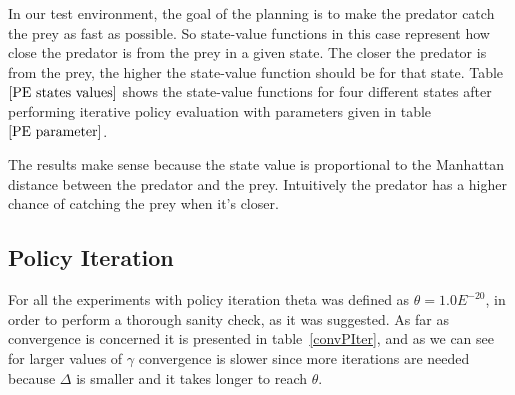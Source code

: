 \documentclass[paper=a4, fontsize=11pt]{scrartcl}
\numberwithin{equation}{section}		%
\numberwithin{figure}{section}			%
\numberwithin{table}{section}				%
\begin{document}
In our test environment, the goal of the planning is to make the predator catch the prey as fast as possible. So state-value functions in this case represent how close the predator is from the prey in a given state. The closer the predator is from the prey, the higher the state-value function should be for that state. Table $\ref{PE states values}$ shows the state-value functions for four different states after performing iterative policy evaluation with parameters given in table $\ref{PE parameter}$.

The results make sense because the state value is proportional to the Manhattan distance between the predator and the prey. Intuitively the predator has a higher chance of catching the prey when it's closer.



\subsection{Policy Iteration}
For all the experiments with policy iteration theta was defined as $\theta = 1.0E^{-20}$, in order to perform a thorough sanity check, as it was suggested. As far as convergence is concerned it is presented in table~\ref{convPIter}, and as we can see for larger values of $\gamma$ convergence is slower since more iterations are needed because $\Delta$ is smaller and it takes longer to reach $\theta$.
\end{document}
